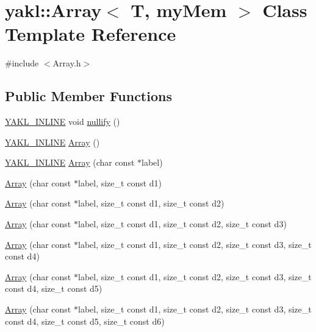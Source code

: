 \hypertarget{classyakl_1_1Array}{}\section{yakl\+:\+:Array$<$ T, my\+Mem $>$ Class Template Reference}
\label{classyakl_1_1Array}


{\ttfamily \#include $<$Array.\+h$>$}

\subsection*{Public Member Functions}
\begin{DoxyCompactItemize}
\item 
\hyperlink{YAKL_8h_aa0dd629ffce6d564b19e9313fb91a5ad}{Y\+A\+K\+L\+\_\+\+I\+N\+L\+I\+NE} void \hyperlink{classyakl_1_1Array_a0be1a80e9ce36080fe21317d929caf7a}{nullify} ()
\item 
\hyperlink{YAKL_8h_aa0dd629ffce6d564b19e9313fb91a5ad}{Y\+A\+K\+L\+\_\+\+I\+N\+L\+I\+NE} \hyperlink{classyakl_1_1Array_a2a77e629aa837ef799f026fb6640698d}{Array} ()
\item 
\hyperlink{YAKL_8h_aa0dd629ffce6d564b19e9313fb91a5ad}{Y\+A\+K\+L\+\_\+\+I\+N\+L\+I\+NE} \hyperlink{classyakl_1_1Array_aad1f943d071f33a58d24a2620430371a}{Array} (char const $\ast$label)
\item 
\hyperlink{classyakl_1_1Array_aa9ffb0eb2d37a3e00e9736106d389bc9}{Array} (char const $\ast$label, size\+\_\+t const d1)
\item 
\hyperlink{classyakl_1_1Array_ab60017090aff5ecb1538dfaebfb41e89}{Array} (char const $\ast$label, size\+\_\+t const d1, size\+\_\+t const d2)
\item 
\hyperlink{classyakl_1_1Array_a723c9cf2c1c7b2c9d780669fd301378d}{Array} (char const $\ast$label, size\+\_\+t const d1, size\+\_\+t const d2, size\+\_\+t const d3)
\item 
\hyperlink{classyakl_1_1Array_a5c607dca94961c1723df1234494e5be0}{Array} (char const $\ast$label, size\+\_\+t const d1, size\+\_\+t const d2, size\+\_\+t const d3, size\+\_\+t const d4)
\item 
\hyperlink{classyakl_1_1Array_a3be98856922ea213bcce4e4eb09f1bb1}{Array} (char const $\ast$label, size\+\_\+t const d1, size\+\_\+t const d2, size\+\_\+t const d3, size\+\_\+t const d4, size\+\_\+t const d5)
\item 
\hyperlink{classyakl_1_1Array_a6128835586282c8a2b4f3ce754aeaa79}{Array} (char const $\ast$label, size\+\_\+t const d1, size\+\_\+t const d2, size\+\_\+t const d3, size\+\_\+t const d4, size\+\_\+t const d5, size\+\_\+t const d6)

\end{DoxyCompactItemize}
